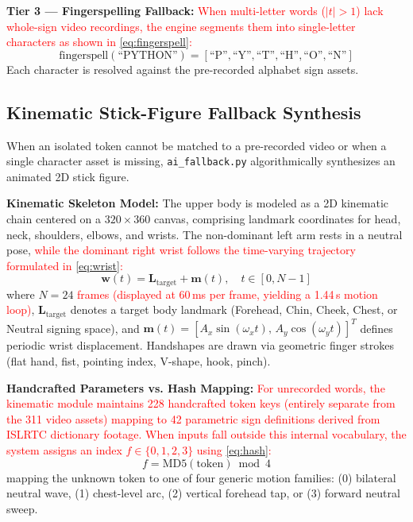 \documentclass[conference,a4paper,10pt]{IEEEtran}
\begin{document}
\textbf{Tier 3 --- Fingerspelling Fallback:} \textcolor{red}{When multi-letter words ($|t|>1$) lack whole-sign video recordings, the engine segments them into single-letter characters as shown in \eqref{eq:fingerspell}:}
\begin{equation}
\text{fingerspell}(\text{``PYTHON''}) = [\text{``P''}, \text{``Y''}, \text{``T''}, \text{``H''}, \text{``O''}, \text{``N''}]
\label{eq:fingerspell}
\end{equation}
Each character is resolved against the pre-recorded alphabet sign assets.

\subsection{Kinematic Stick-Figure Fallback Synthesis}
\label{subsec:ai_fallback}

When an isolated token cannot be matched to a pre-recorded video or when a single character asset is missing, \texttt{ai\_fallback.py} algorithmically synthesizes an animated 2D stick figure.

\textbf{Kinematic Skeleton Model:} The upper body is modeled as a 2D kinematic chain centered on a $320 \times 360$ canvas, comprising landmark coordinates for head, neck, shoulders, elbows, and wrists. The non-dominant left arm rests in a neutral pose, \textcolor{red}{while the dominant right wrist follows the time-varying trajectory formulated in \eqref{eq:wrist}:}
\begin{equation}
\mathbf{w}(t) = \mathbf{L}_{\text{target}} + \mathbf{m}(t), \quad t \in [0, N-1]
\label{eq:wrist}
\end{equation}
where $N = 24$ \textcolor{red}{frames (displayed at 60\,ms per frame, yielding a 1.44\,s motion loop)}, $\mathbf{L}_{\text{target}}$ denotes a target body landmark (Forehead, Chin, Cheek, Chest, or Neutral signing space), and $\mathbf{m}(t) = [A_x \sin(\omega_x t),\, A_y \cos(\omega_y t)]^T$ defines periodic wrist displacement. Handshapes are drawn via geometric finger strokes (flat hand, fist, pointing index, V-shape, hook, pinch).

\textbf{Handcrafted Parameters vs. Hash Mapping:} \textcolor{red}{For unrecorded words, the kinematic module maintains 228 handcrafted token keys (entirely separate from the 311 video assets) mapping to 42 parametric sign definitions derived from ISLRTC dictionary footage. When inputs fall outside this internal vocabulary, the system assigns an index $f \in \{0, 1, 2, 3\}$ using \eqref{eq:hash}:}
\begin{equation}
f = \text{MD5}(\text{token}) \bmod 4
\label{eq:hash}
\end{equation}
mapping the unknown token to one of four generic motion families: (0) bilateral neutral wave, (1) chest-level arc, (2) vertical forehead tap, or (3) forward neutral sweep.
\end{document}
